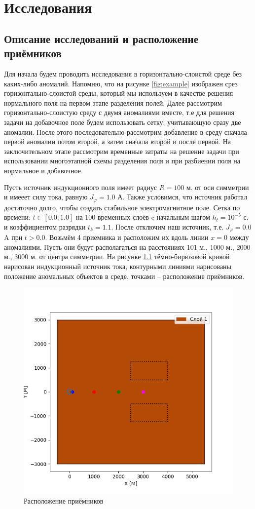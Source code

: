 \chapter{Исследования}

\section{Описание исследований и расположение приёмников}

Для начала будем проводить исследования в горизонтально-слоистой среде без каких-либо аномалий. Напомню, что на рисунке \ref{fig:example} изображен срез горизонтально-слоистой среды, который мы используем в качестве решения нормального поля на первом этапе разделения полей. Далее рассмотрим горизонтально-слоистую среду с двумя аномалиями вместе, т.е для решения задачи на добавочное поле будем использовать сетку, учитывающую сразу две аномалии. После этого последовательно рассмотрим добавление в среду сначала первой аномалии потом второй, а затем сначала второй и после первой. На заключительном этапе рассмотрим временные затраты на решение задачи при использовании многоэтапной схемы разделения поля и при разбиении поля на нормальное и добавочное.

Пусть источник индукционного поля имеет радиус $R = 100$ м. от оси симметрии и имееет силу тока, равную $J_{\varphi} = 1.0$ А. Также условимся, что источник работал достаточно долго, чтобы создать стабильное электромагнитное поле. Сетка по времени: $t \in [0.0; 1.0]$ на 100 временных слоёв c начальным шагом $h_t = 10^{-5}$ с. и коэффициентом разрядки $t_k = 1.1$. После отключим наш источник, т.е. $J_{\varphi} = 0.0$ A при $t > 0.0$. Возьмём 4 приемника и расположим их вдоль линии $x = 0$ между аномалиями. Пусть они будут располагаться на расстояниях 101 м., 1000 м., 2000 м., 3000 м. от центра симметрии. На рисунке \ref{fig:receivers_info} тёмно-бирюзовой кривой нарисован индукционный источник тока, контурными линиями нарисованы положение аномальных объектов в среде, точками -- расположение приёмников.


\begin{figure}
	\centering
	\vspace*{0.7cm}
	\includegraphics[width=0.7\linewidth]{images/receivers_location.png}
	\caption{Расположение приёмников}
	\label{fig:receivers_info}
\end{figure}



